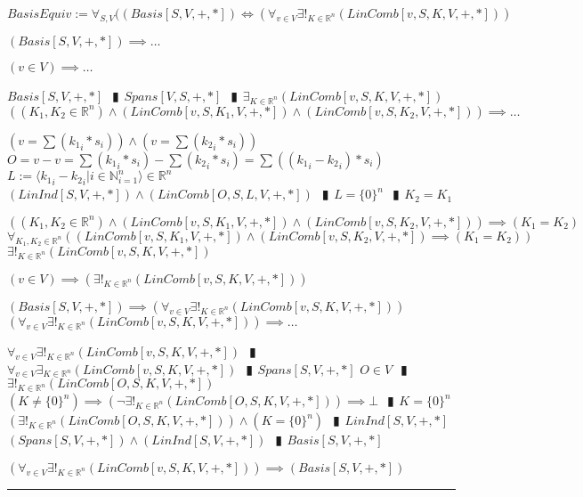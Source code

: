 \documentclass{book}
\newcommand{\abr}{:=}
\newcommand{\pipe}{$\phantom{(}\vrectangleblack\phantom{)}$}
\begin{document}
$BasisEquiv \abr \forall_{S, V}((Basis[S, V, +, *]) \iff (\forall_{v \in V} \exists!_{K \in \mathbb{R}^n}(LinComb[v, S, K, V, +, *]))$
\begin{enumerate}
  \lit $(Basis[S, V, +, *]) \implies \ldots$
  \begin{enumerate}
    \lit $(v \in V) \implies \ldots$
    \begin{enumerate}
      \lit $Basis[S, V, +, *]$ \pipe $Spans[V, S, +, *]$ \pipe $\exists_{K \in \mathbb{R}^n}(LinComb[v, S, K, V, +, *])$
      \lit $((K_1, K_2 \in \mathbb{R}^n) \land (LinComb[v, S, K_1, V, +, *]) \land (LinComb[v, S, K_2, V, +, *])) \implies \ldots$
      \begin{enumerate}
        \lit $(v = \sum({k_1}_i * s_i)) \land (v = \sum({k_2}_i * s_i))$
        \lit $O = v - v = \sum({k_1}_i * s_i) - \sum({k_2}_i * s_i) = \sum(({k_1}_i - {k_2}_i) * s_i)$
        \lit $L \abr \langle {k_1}_i - {k_2}_i | i \in \mathbb{N}_{i = 1}^n \rangle \in \mathbb{R}^n$
        \lit $(LinInd[S, V, +, *]) \land (LinComb[O, S, L, V, +, *])$ \pipe $L = \{0\}^n$ \pipe $K_2 = K_1$
      \end{enumerate}
      \lit $((K_1, K_2 \in \mathbb{R}^n) \land (LinComb[v, S, K_1, V, +, *]) \land (LinComb[v, S, K_2, V, +, *])) \implies (K_1 = K_2)$
      \lit $\forall_{K_1, K_2 \in \mathbb{R}^n}((LinComb[v, S, K_1, V, +, *]) \land (LinComb[v, S, K_2, V, +, *]) \implies (K_1 = K_2))$
      \lit $\exists!_{K \in \mathbb{R}^n}(LinComb[v, S, K, V, +, *])$
    \end{enumerate}
    \lit $(v \in V) \implies (\exists!_{K \in \mathbb{R}^n}(LinComb[v, S, K, V, +, *]))$
    \end{enumerate}
  \lit $(Basis[S, V, +, *]) \implies (\forall_{v \in V} \exists!_{K \in \mathbb{R}^n}(LinComb[v, S, K, V, +, *]))$
  \lit $(\forall_{v \in V} \exists!_{K \in \mathbb{R}^n}(LinComb[v, S, K, V, +, *])) \implies \ldots$
  \begin{enumerate}
    \lit $\forall_{v \in V} \exists!_{K \in \mathbb{R}^n}(LinComb[v, S, K, V, +, *])$ \pipe $\forall_{v \in V} \exists_{K \in \mathbb{R}^n}(LinComb[v, S, K, V, +, *])$ \pipe $Spans[S, V, +, *]$
    \lit $O \in V$ \pipe $\exists!_{K \in \mathbb{R}^n}(LinComb[O, S, K, V, +, *])$
    \lit $(K \neq \{0\}^n) \implies (\lnot \exists!_{K \in \mathbb{R}^n}(LinComb[O, S, K, V, +, *])) \implies \bot$ \pipe $K = \{0\}^n$
    \lit $(\exists!_{K \in \mathbb{R}^n}(LinComb[O, S, K, V, +, *])) \land (K = \{0\}^n)$ \pipe $LinInd[S, V, +, *]$
    \lit $(Spans[S, V, +, *]) \land (LinInd[S, V, +, *])$ \pipe $Basis[S, V, +, *]$
  \end{enumerate}
  \lit $(\forall_{v \in V} \exists!_{K \in \mathbb{R}^n}(LinComb[v, S, K, V, +, *])) \implies (Basis[S, V, +, *])$
\end{enumerate} \vspace{.75mm} \hrule \vspace{.75mm} \ \\ 
\end{document}
